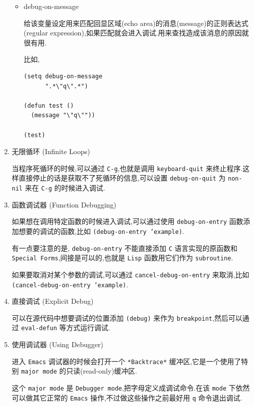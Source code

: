 \documentclass[11pt]{article}
\begin{document}
\begin{enumerate}
\begin{itemize}
\item debug-on-message

给该变量设定用来匹配回显区域(echo area)的消息(message)的正则表达式(regular expression),如果匹配就会进入调试.用来查找造成该消息的原因就很有用.

比如,

\begin{verbatim}
(setq debug-on-message
      ".*\"q\".*")

(defun test ()
  (message "\"q\""))

(test)
\end{verbatim}
\end{itemize}


\item 无限循环 (Infinite Loops)
\label{sec:org0c2ddb2}

当程序死循环的时候,可以通过 \texttt{C-g},也就是调用 \texttt{keyboard-quit} 来终止程序.这样直接停止的话是获取不了死循环的信息,可以设置 \texttt{debug-on-quit} 为 \texttt{non-nil} 来在 \texttt{C-g} 的时候进入调试.


\item 函数调试器 (Function Debugging)
\label{sec:org64766e1}

如果想在调用特定函数的时候进入调试,可以通过使用 \texttt{debug-on-entry} 函数添加想要的调试的函数,比如 \texttt{(debug-on-entry 'example)}.

有一点要注意的是, \texttt{debug-on-entry} 不能直接添加 \texttt{C} 语言实现的原函数和 \texttt{Special Forms},间接是可以的,也就是 \texttt{Lisp} 函数用它们作为 \texttt{subroutine}.

如果要取消对某个参数的调试,可以通过 \texttt{cancel-debug-on-entry} 来取消,比如 \texttt{(cancel-debug-on-entry 'example)}.


\item 直接调试 (Explicit Debug)
\label{sec:orgd400a0f}

可以在源代码中想要调试的位置添加 \texttt{(debug)} 来作为 \texttt{breakpoint},然后可以通过 \texttt{eval-defun} 等方式运行调试.


\item 使用调试器 (Using Debugger)
\label{sec:org81a9bdc}

进入 \texttt{Emacs} 调试器的时候会打开一个 \texttt{*Backtrace*} 缓冲区,它是一个使用了特别 \texttt{major mode} 的只读(read-only)缓冲区.

这个 \texttt{major mode} 是 \texttt{Debugger mode},把字母定义成调试命令.在该 \texttt{mode} 下依然可以做其它正常的 \texttt{Emacs} 操作,不过做这些操作之前最好用 \texttt{q} 命令退出调试.


\end{enumerate}
\end{document}
